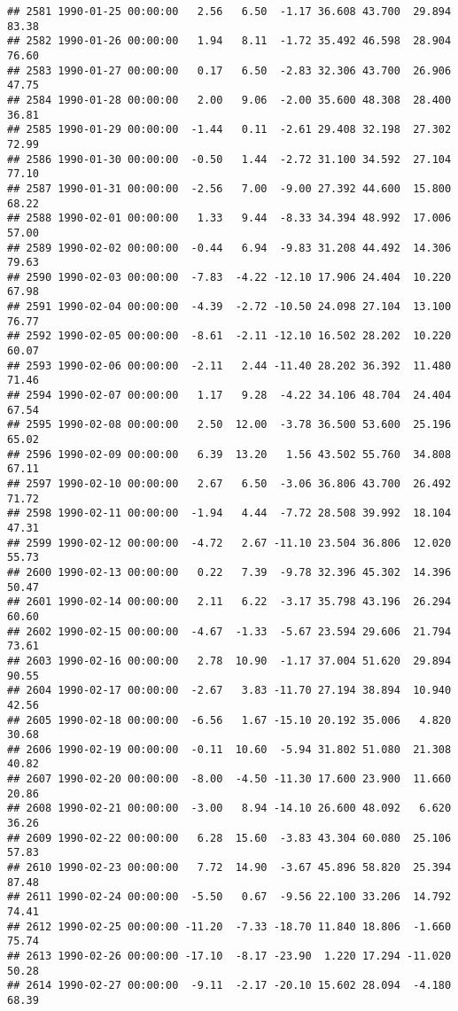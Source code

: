 \documentclass{article}\usepackage{graphicx, color}
\makeatletter
\newenvironment{kframe}{%
 \def\at@end@of@kframe{}%
 \ifinner\ifhmode%
  \def\at@end@of@kframe{\end{minipage}}%
  \begin{minipage}{\columnwidth}%
 \fi\fi%
 \def\FrameCommand##1{\hskip\@totalleftmargin \hskip-\fboxsep
 \colorbox{shadecolor}{##1}\hskip-\fboxsep
     \hskip-\linewidth \hskip-\@totalleftmargin \hskip\columnwidth}%
 \MakeFramed {\advance\hsize-\width
   \@totalleftmargin\z@ \linewidth\hsize
   \@setminipage}}%
 {\par\unskip\endMakeFramed%
 \at@end@of@kframe}
\newenvironment{knitrout}{}{} %
\makeatother
\begin{document}
\begin{knitrout}
\begin{kframe}
\begin{verbatim}
## 2581 1990-01-25 00:00:00   2.56   6.50  -1.17 36.608 43.700  29.894  83.38
## 2582 1990-01-26 00:00:00   1.94   8.11  -1.72 35.492 46.598  28.904  76.60
## 2583 1990-01-27 00:00:00   0.17   6.50  -2.83 32.306 43.700  26.906  47.75
## 2584 1990-01-28 00:00:00   2.00   9.06  -2.00 35.600 48.308  28.400  36.81
## 2585 1990-01-29 00:00:00  -1.44   0.11  -2.61 29.408 32.198  27.302  72.99
## 2586 1990-01-30 00:00:00  -0.50   1.44  -2.72 31.100 34.592  27.104  77.10
## 2587 1990-01-31 00:00:00  -2.56   7.00  -9.00 27.392 44.600  15.800  68.22
## 2588 1990-02-01 00:00:00   1.33   9.44  -8.33 34.394 48.992  17.006  57.00
## 2589 1990-02-02 00:00:00  -0.44   6.94  -9.83 31.208 44.492  14.306  79.63
## 2590 1990-02-03 00:00:00  -7.83  -4.22 -12.10 17.906 24.404  10.220  67.98
## 2591 1990-02-04 00:00:00  -4.39  -2.72 -10.50 24.098 27.104  13.100  76.77
## 2592 1990-02-05 00:00:00  -8.61  -2.11 -12.10 16.502 28.202  10.220  60.07
## 2593 1990-02-06 00:00:00  -2.11   2.44 -11.40 28.202 36.392  11.480  71.46
## 2594 1990-02-07 00:00:00   1.17   9.28  -4.22 34.106 48.704  24.404  67.54
## 2595 1990-02-08 00:00:00   2.50  12.00  -3.78 36.500 53.600  25.196  65.02
## 2596 1990-02-09 00:00:00   6.39  13.20   1.56 43.502 55.760  34.808  67.11
## 2597 1990-02-10 00:00:00   2.67   6.50  -3.06 36.806 43.700  26.492  71.72
## 2598 1990-02-11 00:00:00  -1.94   4.44  -7.72 28.508 39.992  18.104  47.31
## 2599 1990-02-12 00:00:00  -4.72   2.67 -11.10 23.504 36.806  12.020  55.73
## 2600 1990-02-13 00:00:00   0.22   7.39  -9.78 32.396 45.302  14.396  50.47
## 2601 1990-02-14 00:00:00   2.11   6.22  -3.17 35.798 43.196  26.294  60.60
## 2602 1990-02-15 00:00:00  -4.67  -1.33  -5.67 23.594 29.606  21.794  73.61
## 2603 1990-02-16 00:00:00   2.78  10.90  -1.17 37.004 51.620  29.894  90.55
## 2604 1990-02-17 00:00:00  -2.67   3.83 -11.70 27.194 38.894  10.940  42.56
## 2605 1990-02-18 00:00:00  -6.56   1.67 -15.10 20.192 35.006   4.820  30.68
## 2606 1990-02-19 00:00:00  -0.11  10.60  -5.94 31.802 51.080  21.308  40.82
## 2607 1990-02-20 00:00:00  -8.00  -4.50 -11.30 17.600 23.900  11.660  20.86
## 2608 1990-02-21 00:00:00  -3.00   8.94 -14.10 26.600 48.092   6.620  36.26
## 2609 1990-02-22 00:00:00   6.28  15.60  -3.83 43.304 60.080  25.106  57.83
## 2610 1990-02-23 00:00:00   7.72  14.90  -3.67 45.896 58.820  25.394  87.48
## 2611 1990-02-24 00:00:00  -5.50   0.67  -9.56 22.100 33.206  14.792  74.41
## 2612 1990-02-25 00:00:00 -11.20  -7.33 -18.70 11.840 18.806  -1.660  75.74
## 2613 1990-02-26 00:00:00 -17.10  -8.17 -23.90  1.220 17.294 -11.020  50.28
## 2614 1990-02-27 00:00:00  -9.11  -2.17 -20.10 15.602 28.094  -4.180  68.39

\end{verbatim}
\end{kframe}
\end{knitrout}
\end{document}
